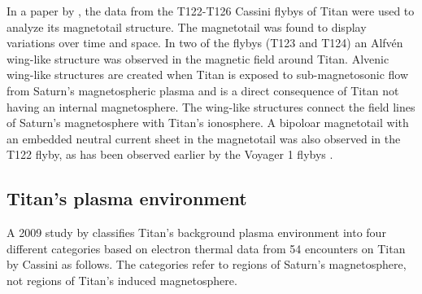 \documentclass[12pt, parskip=full*, abstract]{scrartcl}
\begin{document}
In a paper by \textcite{alfven-wing-structure}, the data from the T122-T126 Cassini flybys of Titan were used to analyze its magnetotail structure. The magnetotail was found to display variations over time and space. In two of the flybys (T123 and T124) an Alfvén wing-like structure was observed in the magnetic field around Titan. Alvenic wing-like structures are created when Titan is exposed to sub-magnetosonic flow from Saturn's magnetospheric plasma and is a direct consequence of Titan not having an internal magnetosphere. The wing-like structures connect the field lines of Saturn's magnetosphere with Titan's ionosphere. A bipoloar magnetotail with an embedded neutral current sheet in the magnetotail was also observed in the T122 flyby, as has been observed earlier by the Voyager 1 flybys \parencite{ness-1982}.


\subsection{Titan's plasma environment}
A 2009 study by \textcite{Rymer-class} classifies Titan's background plasma environment into four different categories based on electron thermal data from 54 encounters on Titan by Cassini as follows. The categories refer to regions of Saturn's magnetosphere, not regions of Titan's induced magnetosphere. 
\end{document}

